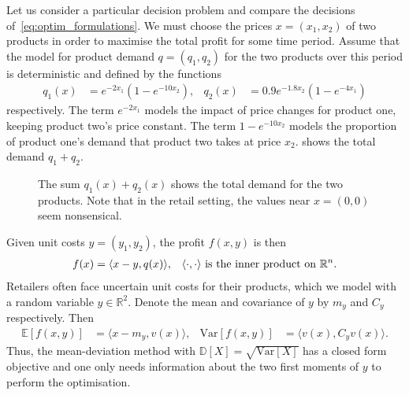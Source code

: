 \documentclass[main.tex]{subfiles}
\begin{document}
\begin{example}
  Let us consider a particular decision problem and compare the
  decisions of~\eqref{eq:optim_formulations}.
  We must choose the prices $x=(x_1,x_2)$ of two products in order to
  maximise the total profit for some time period.
  Assume that the model for product demand $q=(q_1,q_2)$ for the two products over
  this period is
  deterministic and defined by the functions
  \begin{align}
    q_1(x) &= e^{-2x_1}(1-e^{-10x_2}),
    &q_2(x)&= 0.9e^{-1.8x_2}(1-e^{-4x_1})
  \end{align}
  respectively.
  The term $e^{-2x_1}$  models the impact of price
  changes for product one, keeping product two's price constant.
  The term $1-e^{-10x_2}$ models the proportion of product one's
  demand that product two takes at price $x_2$.
   shows the total demand $q_1+q_2$.
  \begin{figure}[htbp]
    \centering
    \caption{The sum $q_1(x)+q_2(x)$ shows the total demand for the two products.
      Note that in the retail setting, the values near $x=(0,0)$ seem
      nonsensical.}\label{fig:total_volume_2d}
  \end{figure}

  Given unit costs $y=(y_1,y_2)$, the profit $f(x,y)$ is then
  \begin{align}
    f(x)
    &=\langle x-y,q(x) \rangle,
    &\langle \cdot,\cdot \rangle
      \textnormal{ is the inner product on } \mathbb{R}^n.
  \end{align}
  Retailers often face uncertain unit costs for their products, which
  we model with a random variable $y\in\mathbb{R}^2$.
  Denote the mean and covariance of
  $y$ by $m_y$ and $C_y$ respectively. Then
  \begin{align}
    \mathbb{E}[f(x,y)]
    &= \langle x-m_y,v(x) \rangle,
    &\mbox{Var}[f(x,y)]
    &= \langle v(x),C_y v(x) \rangle.
  \end{align}
  Thus, the mean-deviation method with
  $\mathbb{D}[X]=\sqrt{\mbox{Var}[X]}$ has a closed form objective and
  one only needs information about the two first moments of $y$ to perform
  the optimisation.


\end{example}
\end{document}
